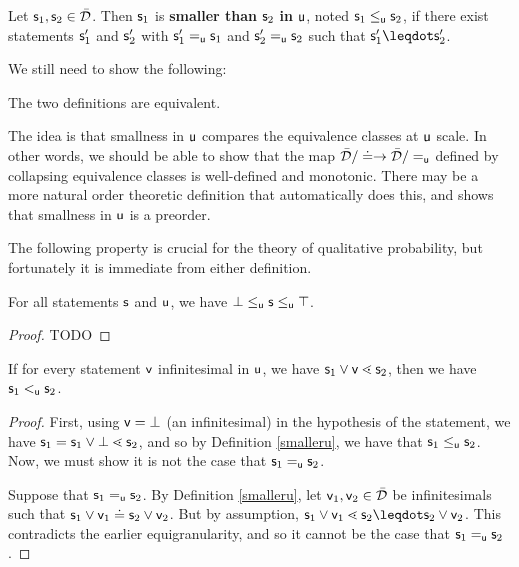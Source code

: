 \documentclass[10pt, onecolumn, longbibliography, nofootinbib]{revtex4-2}
\begin{document}
\begin{defn}\label{smalleru2}
	Let $\stmt_1, \stmt_2 \in \tdomain$. Then $\stmt_1$ is \textbf{smaller than} $\stmt_2$ \textbf{in} $\stmt[u]$, noted $\stmt_1 \lequ \stmt_2$, if there exist statements $\stmt_1'$ and $\stmt_2'$ with $\stmt_1'\equ\stmt_1$ and $\stmt_2'\equ\stmt_2$ such that $\stmt_1'\finer\stmt_2'$.
\end{defn}

We still need to show the following:

\begin{desid}
	The two definitions are equivalent.
\end{desid}

\begin{remark}
	The idea is that smallness in $\stmt[u]$ compares the equivalence classes at $\stmt[u]$ scale. In other words, we should be able to show that the map $\tdomain / \eqgran \to \tdomain / \equ$ defined by collapsing equivalence classes is well-defined and monotonic. There may be a more natural order theoretic definition that automatically does this, and shows that smallness in $\stmt[u]$ is a preorder.
\end{remark}

The following property is crucial for the theory of qualitative probability, but fortunately it is immediate from either definition. 

\begin{prop}
For all statements $\stmt$ and $\stmt[u]$, we have $\impossibility\lequ\stmt\lequ\certainty$.
\end{prop}
\begin{proof}
	TODO
\end{proof}

\begin{prop}
	If for every statement $\stmt[v]$ infinitesimal in $\stmt[u]$, we have $\stmt_1\OR\stmt[v] \sfiner \stmt_2$, then we have $\stmt_1 \leu \stmt_2$. 
\end{prop}
\begin{proof}
	First, using $\stmt[v] = \impossibility$ (an infinitesimal) in the hypothesis of the statement, we have $\stmt_1 = \stmt_1\OR\impossibility \sfiner \stmt_2$, and so by Definition \ref{smalleru}, we have that $\stmt_1\lequ\stmt_2$. Now, we must show it is not the case that $\stmt_1\equ \stmt_2$. 
	
	Suppose that $\stmt_1 \equ \stmt_2$. By Definition \ref{smalleru}, let $\stmt[v]_1,\stmt[v]_2\in\tdomain$ be infinitesimals such that $\stmt_1 \OR \stmt[v]_1 \eqgran \stmt_2 \OR \stmt[v]_2$. But by assumption, $\stmt_1\OR\stmt[v]_1 \sfiner \stmt_2 \finer\stmt_2\OR\stmt[v]_2$. This contradicts the earlier equigranularity, and so it cannot be the case that $\stmt_1\equ\stmt_2$. 
\end{proof}
\end{document}
